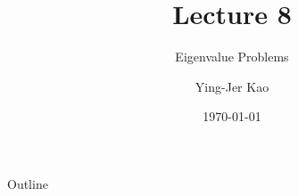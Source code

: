 \documentclass{beamer}
\title[Eigenvalue Problems] %
{Lecture 8}
\subtitle
{Eigenvalue Problems} %
\author[Ying-Jer Kao] %
{Ying-Jer Kao}
\institute[National Taiwan University] %
{
  Department of Physics\\
 National Taiwan University
  }
\date[Numerical Analysis and Programming] %
{\today}
\begin{document}
\begin{frame}
  \titlepage
\end{frame}

\begin{frame}{Outline}
  \tableofcontents
\end{frame}



\end{document}
